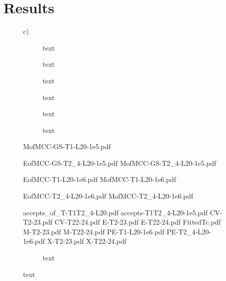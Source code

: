 \documentclass{emulateapj}
\begin{document}
\section{Results}
\label{sec:results}
\begin{figure}[t]

c)
\begin{figure}
\mbox{}
\caption{text}
\label{fig:E(mcc)T1}
\end{figure}

\begin{figure}
\mbox{}
\caption{text}
\label{fig:E(mcc)T1}
\end{figure}

\begin{figure}
\mbox{}
\caption{text}
\label{fig:E(mcc)T1}
\end{figure}

\begin{figure}
\mbox{}
\caption{text}
\label{fig:E(mcc)T1}
\end{figure}

\begin{figure}
\mbox{}
\caption{text}
\label{fig:E(mcc)T1}
\end{figure}

\begin{figure}
\mbox{}
\caption{text}
\label{fig:E(mcc)T1}
\end{figure}

MofMCC-GS-T1-L20-1e5.pdf

EofMCC-GS-T2_4-L20-1e5.pdf
MofMCC-GS-T2_4-L20-1e5.pdf

EofMCC-T1-L20-1e6.pdf
MofMCC-T1-L20-1e6.pdf

EofMCC-T2_4-L20-1e6.pdf
MofMCC-T2_4-L20-1e6.pdf



accepts_of_T-T1T2_4-L20.pdf
accepts-T1T2_4-L20-1e5.pdf
CV-T2-23.pdf
CV-T22-24.pdf
E-T2-23.pdf
E-T22-24.pdf
FittedTc.pdf
M-T2-23.pdf
M-T22-24.pdf
PE-T1-L20-1e6.pdf
PE-T2_4-L20-1e6.pdf
X-T2-23.pdf
X-T22-24.pdf

\begin{figure}
\mbox{}
\caption{text}
\label{fig:figure_label}
\end{figure}





\end{figure}
\end{document}
